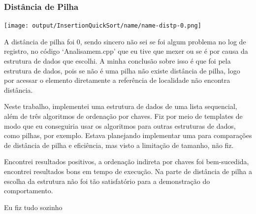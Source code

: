 \documentclass[a4paper,12pt]{article}
\begin{document}
\subsubsection{Distância de Pilha}
\begin{center}
    \texttt{[image: output/InsertionQuickSort/name/name-distp-0.png]}
\end{center}
A distância de pilha foi 0, sendo sincero não sei se foi algum problema no log de registro, no código `Analisamem.cpp' que eu tive que mexer ou se é por causa da estrutura de dados que escolhi.
A minha conclusão sobre isso é que foi pela estrutura de dados, pois se não é uma pilha não existe distância de pilha, logo por acessar o elemento diretamente a referência de localidade não encontra distância.

Neste trabalho, implementei uma estrutura de dados de uma lista sequencial, além de três algoritmos de ordenação por chaves. 
Fiz por meio de templates de modo que eu conseguiria usar os algoritmos para outras estruturas de dados, como pilhas, por exemplo.
Estava planejando implementar uma para comparações de distância de pilha e eficiência, mas visto a limitação de tamanho, não fiz.

Encontrei resultados positivos, a ordenação indireta por chaves foi bem-sucedida, encontrei resultados bons em tempo de execução.
Na parte de distância de pilha a escolha da estrutura não foi tão satisfatório para a demonstração do comportamento.


\begin{thebibliography}{9}
     Eu fiz tudo sozinho
\end{thebibliography}
\end{document}
